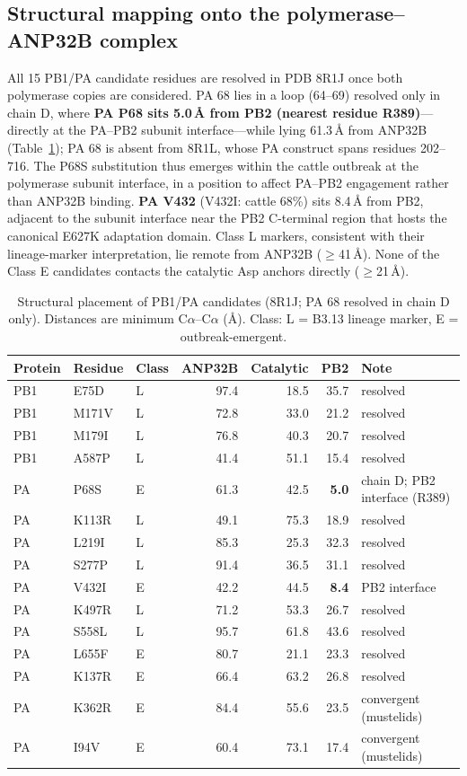 \documentclass[11pt]{article}
\begin{document}
\subsection{Structural mapping onto the polymerase--ANP32B complex}
All 15 PB1/PA candidate residues are resolved in PDB 8R1J once both polymerase copies are considered. PA 68 lies in a loop (64--69) resolved only in chain D, where \textbf{PA P68 sits 5.0\,\AA{} from PB2 (nearest residue R389)}---directly at the PA--PB2 subunit interface---while lying 61.3\,\AA{} from ANP32B (Table~\ref{tab:struct}); PA 68 is absent from 8R1L, whose PA construct spans residues 202--716. The P68S substitution thus emerges within the cattle outbreak at the polymerase subunit interface, in a position to affect PA--PB2 engagement rather than ANP32B binding. \textbf{PA V432} (V432I: cattle 68\%) sits 8.4\,\AA{} from PB2, adjacent to the subunit interface near the PB2 C-terminal region that hosts the canonical E627K adaptation domain. Class L markers, consistent with their lineage-marker interpretation, lie remote from ANP32B ($\geq$41\,\AA{}). None of the Class E candidates contacts the catalytic Asp anchors directly ($\geq$21\,\AA{}).

\begin{table}[!htbp]\centering\small
\caption{Structural placement of PB1/PA candidates (8R1J; PA 68 resolved in chain D only). Distances are minimum C$\alpha$--C$\alpha$ (\AA). Class: L = B3.13 lineage marker, E = outbreak-emergent.}
\label{tab:struct}
\begin{tabular}{lllrrrl}
\hline
Protein & Residue & Class & ANP32B & Catalytic & PB2 & Note \\
\hline
PB1 & E75D & L & 97.4 & 18.5 & 35.7 & resolved \\
PB1 & M171V & L & 72.8 & 33.0 & 21.2 & resolved \\
PB1 & M179I & L & 76.8 & 40.3 & 20.7 & resolved \\
PB1 & A587P & L & 41.4 & 51.1 & 15.4 & resolved \\
PA & P68S & E & 61.3 & 42.5 & \textbf{5.0} & chain D; PB2 interface (R389) \\
PA & K113R & L & 49.1 & 75.3 & 18.9 & resolved \\
PA & L219I & L & 85.3 & 25.3 & 32.3 & resolved \\
PA & S277P & L & 91.4 & 36.5 & 31.1 & resolved \\
PA & V432I & E & 42.2 & 44.5 & \textbf{8.4} & PB2 interface \\
PA & K497R & L & 71.2 & 53.3 & 26.7 & resolved \\
PA & S558L & L & 95.7 & 61.8 & 43.6 & resolved \\
PA & L655F & E & 80.7 & 21.1 & 23.3 & resolved \\
PA & K137R & E & 66.4 & 63.2 & 26.8 & resolved \\
PA & K362R & E & 84.4 & 55.6 & 23.5 & convergent (mustelids) \\
PA & I94V & E & 60.4 & 73.1 & 17.4 & convergent (mustelids) \\
\hline
\end{tabular}
\end{table}
\end{document}
